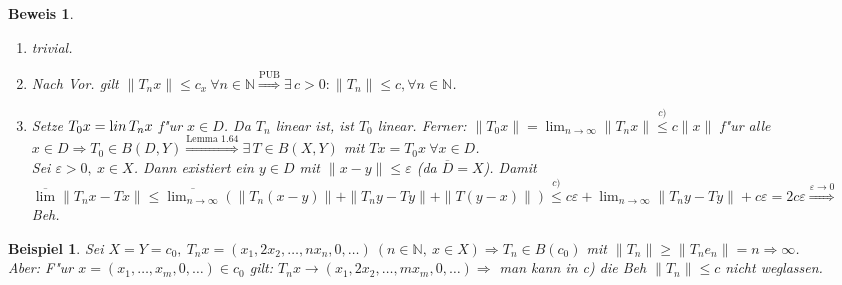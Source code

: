 \documentclass[a4paper,11pt]{book}
\newcommand{\N}{{\mathbb N}}
\newcommand{\eps}{{\varepsilon}}
\newcommand{\lin}{\ensuremath{\text lin}\,} %
\newtheorem{Bsp}[Def]{Beispiel}
\theoremstyle{nonumberplain}
\newtheorem{Bew}{Beweis}
\begin{document}
\begin{Bew}
\begin{enumerate}
\item[a) $\Rightarrow$ b)] trivial.

\item[b) $\Rightarrow$ c)] Nach Vor. gilt $\|T_nx\| \leq c_x\ \forall n \in \N \stackrel{\text{PUB}}{\Rightarrow} \exists\, c > 0: \|T_n\| \leq c, \forall n \in \N$.

\item[c) $\Rightarrow$ a)] Setze $T_0x = \lin T_nx$ f"ur $x \in D$. Da $T_n$ linear ist, ist $T_0$ linear. Ferner: $\|T_0x\| = \lim_{n \rightarrow \infty} \|T_nx\| \stackrel{c)}{\leq} c \|x\|$ f"ur alle $x \in D \Rightarrow T_0 \in B(D,Y) \stackrel{\text{Lemma 1.64}}{\Longrightarrow} \exists\, T \in B(X,Y)$ mit $Tx = T_0x\ \forall x \in D$.\\
Sei $\eps > 0,\ x \in X$. Dann existiert ein $y \in D$ mit $\|x-y\| \leq \eps$ (da $\overline{D} = X$). Damit $\overline{\lim} \|T_nx-Tx\| \leq \overline{\lim_{n \rightarrow \infty}} ( \|T_n(x-y)\| + \|T_ny - Ty\| + \|T(y-x)\|) \stackrel{c)}{\leq} c \eps + \lim_{n \rightarrow \infty} \|T_ny - Ty\| + c \eps = 2c\eps \stackrel{\eps \rightarrow 0}{\Rightarrow}$ Beh.
\end{enumerate}
\end{Bew}


\begin{Bsp}
Sei $X = Y = c_0,\ T_nx = (x_1,2x_2,\dots,nx_n,0,\dots)\ (n \in \N,\ x \in X) \Rightarrow T_n \in B(c_0)$ mit $\|T_n\| \geq \|T_n e_n\| = n \Rightarrow \infty$.\\
Aber: F"ur $x = (x_1,\dots,x_m,0,\dots) \in c_0$ gilt: $T_nx \rightarrow (x_1,2x_2,\dots,mx_m,0,\dots) \Rightarrow$ man kann in c) die Beh $\|T_n\| \leq c$ nicht weglassen.
\end{Bsp}
\end{document}

